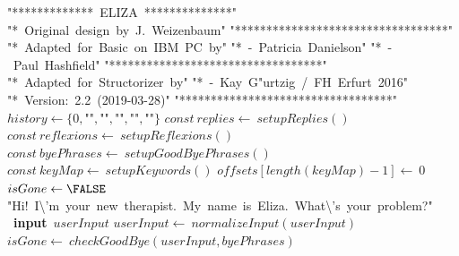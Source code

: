 \documentclass[a4paper,10pt]{article}
\begin{document}
\begin{algorithm}
\caption{ELIZA()}
\begin{algorithmic}[5]

\STATE {}
\STATE {}
\STATE {}
\STATE {}
\STATE {}
\STATE {}
\STATE {}
\STATE {}
\STATE {}
\STATE {}
  \PRINT\(\)"{}*************\ ELIZA\ **************"{}\(\)
  \PRINT\(\)"{}*\ Original\ design\ by\ J.\ Weizenbaum"{}\(\)
  \PRINT\(\)"{}**********************************"{}\(\)
  \PRINT\(\)"{}*\ Adapted\ for\ Basic\ on\ IBM\ PC\ by"{}\(\)
  \PRINT\(\)"{}*\ -\ Patricia\ Danielson"{}\(\)
  \PRINT\(\)"{}*\ -\ Paul\ Hashfield"{}\(\)
  \PRINT\(\)"{}**********************************"{}\(\)
  \PRINT\(\)"{}*\ Adapted\ for\ Structorizer\ by"{}\(\)
  \PRINT\(\)"{}*\ -\ Kay\ G"urtzig\ /\ FH\ Erfurt\ 2016"{}\(\)
  \PRINT\(\)"{}*\ Version:\ 2.2\ (2019-03-28)"{}\(\)
  \PRINT\(\)"{}**********************************"{}\(\)
  \STATE {}
  \STATE {}
  \STATE \(history\gets\{0,\)"{}"{}\(,\)"{}"{}\(,\)"{}"{}\(,\)"{}"{}\(,\)"{}"{}\(\}\)
  \STATE \(const\ replies\gets\ setupReplies()\)
  \STATE \(const\ reflexions\gets\ setupReflexions()\)
  \STATE \(const\ byePhrases\gets\ setupGoodByePhrases()\)
  \STATE \(const\ keyMap\gets\ setupKeywords()\)
  \STATE \(offsets[length(keyMap)-1]\gets\ 0\)
  \STATE \(isGone\gets\FALSE\)
  \PRINT\(\)"{}Hi!\ I\textbackslash{}'{}m\ your\ new\ therapist.\ My\ name\ is\ Eliza.\ What\textbackslash{}'{}s\ your\ problem?"{}\(\)
  \REPEAT
    \STATE\ \textbf{input}\ \(userInput\)
    \STATE {}
    \STATE {}
    \STATE \(userInput\gets\ normalizeInput(userInput)\)
    \STATE \(isGone\gets\ checkGoodBye(userInput,byePhrases)\)

\end{algorithmic}
\end{algorithm}
\end{document}
